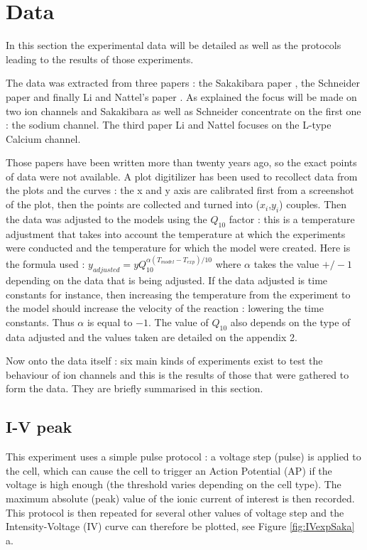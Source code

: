 \documentclass[11pt]{report}
\begin{document}
\section{Data}

In this section the experimental data will be detailed as well as the  protocols leading to the results of those experiments.

The data was extracted from three papers : the Sakakibara paper \cite{Sakakibara1992}, the Schneider \cite{Schneider1994} paper and finally Li and Nattel's paper \cite{Li1997}. As explained the focus will be made on two ion channels and Sakakibara \cite{Sakakibara1992} as well as Schneider \cite{Schneider1994} concentrate on the first one : the sodium channel.
The third paper Li and Nattel \cite{Li1997} focuses on the L-type Calcium channel.

Those papers have been written more than twenty years ago, so the exact points of data were not available. A plot digitilizer has been used to recollect data from the plots and the curves : the x and y axis are calibrated first from a screenshot of the plot, then the points are collected and turned into ($x_{i}$,$y_{i}$) couples. Then the data was adjusted to the models using the $Q_{10}$ factor : this is a temperature adjustment that takes into account the temperature at which the experiments were conducted and the temperature for which the model were created. Here is the formula used : $y_{adjusted} = y Q_{10}^{\alpha (T_{model}-T_{exp})/10}$ where $\alpha$ takes the value $+/-1$ depending on the data that is being adjusted. If the data adjusted is time constants for instance, then increasing the temperature from the experiment to the model should increase the velocity of the reaction : lowering the time constants. Thus $\alpha$ is equal to $-1$. The value of $Q_{10}$ also depends on the type of data adjusted and the values taken are detailed on the appendix 2.

Now onto the data itself : six main kinds of experiments exist to test the behaviour of ion channels and this is the results of those that were gathered to form the data. They are briefly summarised in this section.

\subsection{I-V peak}

This experiment uses a simple pulse protocol : a voltage step (pulse) is applied to the cell, which can cause the cell to trigger an Action Potential (AP) if the voltage is high enough (the threshold varies depending on the cell type). The maximum absolute (peak) value of the ionic current of interest is then recorded. This protocol is then repeated for several other values of voltage step and the Intensity-Voltage (IV) curve can therefore be plotted, see Figure \ref{fig:IVexpSaka} a. 
\end{document}
